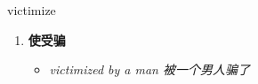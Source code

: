 
\begin{frame}
{\huge victimize}
\begin{center}
\begin{enumerate}\Large
  \item \textbf{使受骗}
  \begin{itemize}
    \item \em{\Large{victimized by a man 被一个男人骗了}}
  \end{itemize}
\end{enumerate}
\end{center}
\end{frame}
